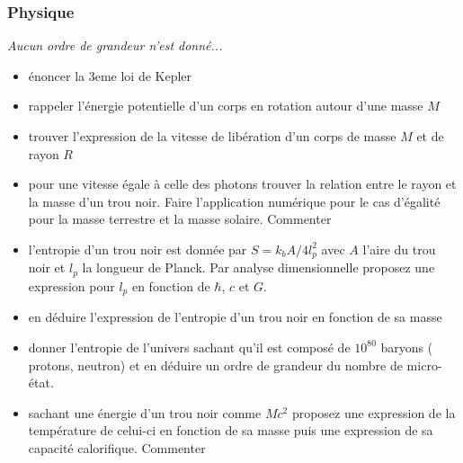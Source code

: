 \documentclass[11pt,a4paper]{article}
\begin{document}
\subsubsection{Physique}
\textit{Aucun ordre de grandeur n'est donné...}
\begin{itemize}
    \item énoncer la 3eme loi de Kepler
    \item ⁠rappeler l’énergie potentielle d’un corps en rotation autour d’une masse $M$ 
    \item trouver l’expression de la vitesse de libération d’un corps de masse $M$ et de rayon $R$
    \item pour une vitesse égale à celle des photons trouver la relation entre le rayon et la masse d’un trou noir. Faire l’application numérique pour le cas d’égalité pour la masse terrestre et la masse solaire. Commenter
    \item ⁠l’entropie d’un trou noir est donnée par $S= k_b A /4l_p^2$ avec $A$ l’aire du trou noir et $l_p$ la longueur de Planck. Par analyse dimensionnelle proposez une expression pour $l_p$ en fonction de $\hbar$, $c$ et $G$.
    \item en déduire l’expression de l’entropie d’un trou noir en fonction de sa masse 
    \item donner l’entropie de l’univers sachant qu’il est composé de $10^80$ baryons ( protons, neutron) et en déduire  un ordre de grandeur du nombre de micro-état.
    \item sachant une énergie d’un trou noir comme $Mc^2$ proposez une expression de la température de celui-ci en fonction de sa masse puis une expression de sa capacité calorifique. Commenter
\end{itemize}
\end{document}
